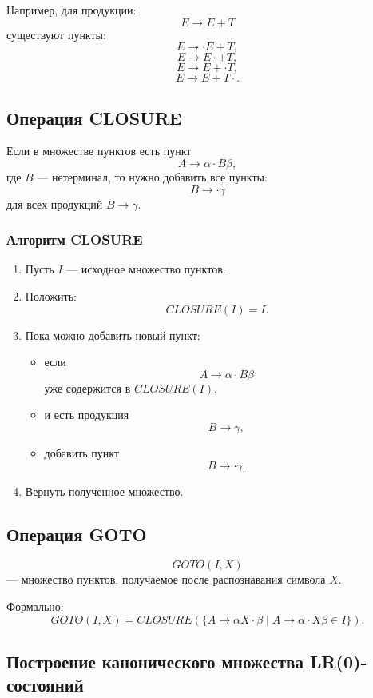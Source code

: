 \documentclass[12pt,a4paper]{article}
\begin{document}
Например, для продукции:
\[
E \to E + T
\]
существуют пункты:
\[
E \to \cdot E + T,
\]
\[
E \to E \cdot + T,
\]
\[
E \to E + \cdot T,
\]
\[
E \to E + T \cdot.
\]

\subsection{Операция CLOSURE}

Если в множестве пунктов есть пункт
\[
A \to \alpha \cdot B \beta,
\]
где $B$ --- нетерминал, то нужно добавить все пункты:
\[
B \to \cdot \gamma
\]
для всех продукций $B \to \gamma$.

\subsubsection*{Алгоритм CLOSURE}

\begin{enumerate}
    \item Пусть $I$ --- исходное множество пунктов.
    \item Положить:
    \[
    CLOSURE(I)=I.
    \]
    \item Пока можно добавить новый пункт:
    \begin{itemize}
        \item если
        \[
        A\to \alpha\cdot B\beta
        \]
        уже содержится в $CLOSURE(I)$,
        \item и есть продукция
        \[
        B\to\gamma,
        \]
        \item добавить пункт
        \[
        B\to\cdot\gamma.
        \]
    \end{itemize}
    \item Вернуть полученное множество.
\end{enumerate}

\subsection{Операция GOTO}

\[
GOTO(I,X)
\]
--- множество пунктов, получаемое после распознавания символа $X$.

Формально:
\[
GOTO(I,X)=CLOSURE(\{A\to\alpha X\cdot\beta
\mid A\to\alpha\cdot X\beta \in I\}).
\]

\subsection{Построение канонического множества LR(0)-состояний}
\end{document}

